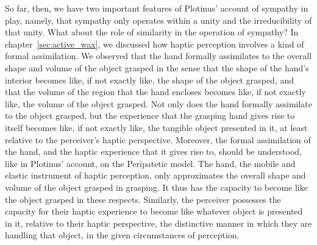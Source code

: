 So far, then, we have two important features of Plotinus' account of sympathy in play, namely, that sympathy only operates within a unity and the irreducibility of that unity. What about the role of similarity in the operation of sympathy? In chapter~\ref{sec:active_wax}, we discussed how haptic perception involves a kind of formal assimilation. We observed that the hand formally assimilates to the overall shape and volume of the object grasped in the sense that the shape of the hand's interior becomes like, if not exactly like, the shape of the object grasped, and that the volume of the region that the hand encloses becomes like, if not exactly like, the volume of the object grasped. Not only does the hand formally assimilate to the object grasped, but the experience that the grasping hand gives rise to itself becomes like, if not exactly like, the tangible object presented in it, at least relative to the perceiver's haptic perspective. Moreover, the formal assimilation of the hand, and the haptic experience that it gives rise to, should be understood, like in Plotinus' account, on the Peripatetic model. The hand, the mobile and elastic instrument of haptic perception, only approximates the overall shape and volume of the object grasped in grasping. It thus has the capacity to become like the object grasped in these respects. Similarly, the perceiver possesses the capacity for their haptic experience to become like whatever object is presented in it, relative to their haptic perspective, the distinctive manner in which they are handling that object, in the given circumstances of perception. 

